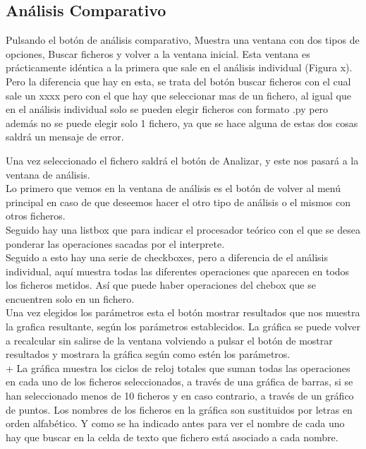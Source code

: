 \subsection{Análisis Comparativo}
Pulsando el botón de análisis comparativo, Muestra una ventana con dos tipos de opciones, Buscar ficheros y volver a la ventana inicial. Esta ventana es prácticamente idéntica a la primera que sale en el análisis individual (Figura x). Pero la diferencia que hay en esta, se trata del botón buscar ficheros con el cual sale un xxxx pero con el que hay que seleccionar mas de un fichero, al igual que en el análisis individual solo se pueden elegir ficheros con formato .py pero además no se puede elegir solo 1 fichero, ya que se hace alguna de estas dos cosas saldrá un mensaje de error.

Una vez seleccionado el fichero saldrá el botón de Analizar, y este nos pasará a la ventana de análisis.\\
Lo primero que vemos en la ventana de análisis es el botón de volver al menú principal en caso de que deseemos hacer el otro tipo de análisis  o el mismos con otros  ficheros.\\

Seguido hay una listbox que para indicar el procesador teórico con el que se desea ponderar  las operaciones sacadas por el interprete.\\

Seguido  a esto hay una serie de checkboxes, pero a diferencia de el análisis individual, aquí muestra todas las diferentes operaciones que aparecen en todos los ficheros metidos. Así que puede haber operaciones del chebox que se encuentren solo en un fichero.\\

Una vez elegidos los parámetros esta el botón mostrar resultados que nos muestra la grafica resultante, según los parámetros establecidos. La gráfica se  puede volver a recalcular sin salirse de la ventana volviendo a  pulsar el botón de mostrar resultados y mostrara la gráfica según como estén los parámetros.\\
 
+ La gráfica muestra los ciclos de reloj totales que suman todas las operaciones en cada uno de los ficheros seleccionados, a través de una gráfica de barras, si se han seleccionado menos de 10 ficheros y en caso contrario, a través de un gráfico de puntos. Los nombres de los ficheros en la gráfica son sustituidos por letras en orden alfabético. Y como se ha indicado antes para ver el nombre de cada uno hay que buscar en la celda de texto que fichero está asociado a cada nombre.



